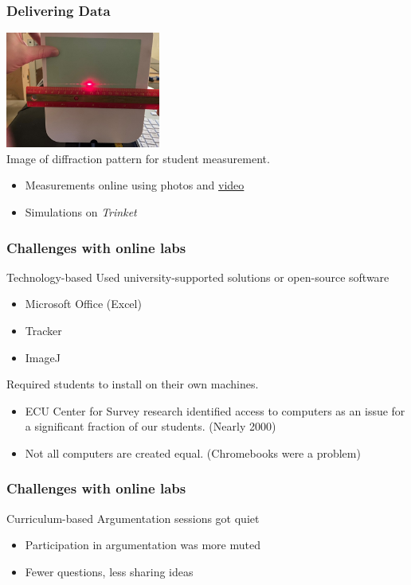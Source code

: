 \documentclass[aspectratio=169,shadow=true]{beamer}
\begin{document}
\begin{frame}
  \frametitle{Delivering Data}
  \begin{center}
    \includegraphics[width=2in]{Hair1_red_pattern.jpg}\\
    {\footnotesize Image of diffraction pattern for student measurement.}
  \end{center}
  \begin{itemize}
    \item Measurements online using photos and
    \href{https://ecu.instructuremedia.com/embed/7b72631f-ea1e-4c4d-a0bd-642c4a2d0356}{video}
    \item Simulations on \emph{Trinket}
  \end{itemize}
\end{frame}

\begin{frame}
  \frametitle{Challenges with online labs}
  \begin{block}{Technology-based}
    Used university-supported solutions or open-source software
    \begin{itemize}
      \item Microsoft Office (Excel)
      \item Tracker
      \item ImageJ
    \end{itemize}
    Required students to install on their own machines.
    \begin{itemize}
      \item ECU Center for Survey research identified access to computers as an issue for a
      significant fraction of our students. (Nearly 2000)
      \item Not all computers are created equal. (Chromebooks were a problem)
    \end{itemize}
  \end{block}
\end{frame}

\begin{frame}
  \frametitle{Challenges with online labs}
  \begin{block}{Curriculum-based}
    Argumentation sessions got quiet
    \begin{itemize}
      \item Participation in argumentation was more muted
      \item Fewer questions, less sharing ideas
    \end{itemize}
  \end{block}
\end{frame}
\end{document}
